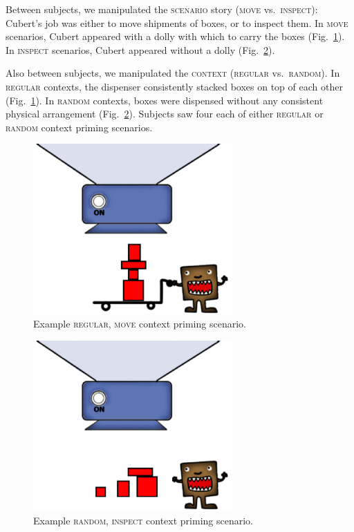 \documentclass[linguex]{sp}
\begin{document}
Between subjects, we manipulated the \textsc{scenario} story (\textsc{move} vs.\ \textsc{inspect}): Cubert's job was either to move shipments of boxes, or to inspect them. In \textsc{move} scenarios, Cubert appeared with a dolly with which to carry the boxes (Fig.\ \ref{regular}). In \textsc{inspect} scenarios, Cubert appeared without a dolly (Fig.\ \ref{random}).

Also between subjects, we manipulated the \textsc{context} (\textsc{regular} vs.\ \textsc{random}). In \textsc{regular} contexts, the dispenser consistently stacked boxes on top of each other (Fig.\ \ref{regular}). In \textsc{random} contexts, boxes were dispensed without any consistent physical arrangement (Fig.\ \ref{random}). Subjects saw four each of either \textsc{regular} or \textsc{random} context priming scenarios.

\begin{figure}[h]
\centering
\includegraphics[width=3in]{images/context13reg.eps}
\caption{Example \textsc{regular}, \textsc{move} context priming scenario.}\label{regular}
\end{figure}

\begin{figure}[h]
\centering
\includegraphics[width=3in]{images/context13nodolly.eps}
\caption{Example \textsc{random}, \textsc{inspect} context priming scenario.}\label{random}
\end{figure}
\end{document}
